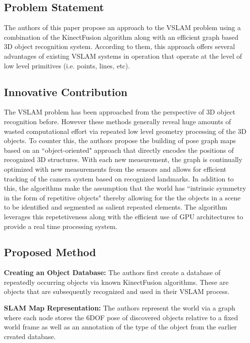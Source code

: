 \documentclass[10pt,twocolumn,letterpaper]{article}
\begin{document}
\subsection{Problem Statement}
The authors of this paper propose an approach to the VSLAM problem using a combination of the KinectFusion algorithm along with an efficient graph based 3D object recognition system. According to them, this approach offers several advantages of existing VSLAM systems in operation that operate at the level of low level primitives (i.e. points, lines, etc). 

\subsection{Innovative Contribution}
The VSLAM problem has been approached from the perspective of 3D object recognition before. However these methods generally reveal  huge amounts of wasted computational effort via repeated low level geometry processing of the 3D objects. To counter this, the authors propose the building of pose graph maps based on an ``object-oriented" approach that directly encodes the positions of recognized 3D structures. With each new measurement, the graph is continually optimized with new measurements from the sensors and allows for efficient tracking of the camera system based on recognized landmarks. In addition to this, the algorithms make the assumption that the world has ``intrinsic symmetry in the form of repetitive objects" thereby allowing for the the objects in a scene to be identified and segmented as salient repeated elements. The algorithm leverages this repetetiveness along with the efficient use of GPU architectures to provide a real time processing system. 

\subsection{Proposed Method}
\textbf{Creating an Object Database:} The authors first create a database of repeatedly occurring objects via known KinectFusion algorithms. These are objects that are subsequently recognized and used in their VSLAM process. 

\textbf{SLAM Map Representation:} The authors represent the world via a graph where each node stores the 6DOF pose of discovered objects relative to a fixed world frame as well as an annotation of the type of the object from the earlier created database. 
\end{document}
